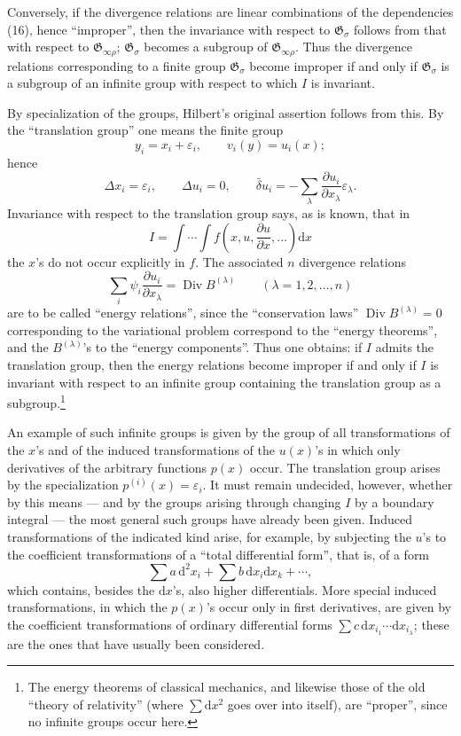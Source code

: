 \documentclass[11pt]{article}
\newcommand{\D}{\Delta}
\providecommand{\eps}{\varepsilon}
\providecommand{\dd}{\mathrm d}
\providecommand{\Div}{\operatorname{Div}}
\providecommand{\G}{\mathfrak G}
\providecommand{\bd}{\bar{\delta}}
\providecommand{\p}{\partial}
\begin{document}
Conversely, if the divergence relations are linear combinations of the dependencies (16), hence ``improper'', then the invariance with respect to \(\G_\sigma\) follows from that with respect to \(\G_{\infty\rho}\); \(\G_\sigma\) becomes a subgroup of \(\G_{\infty\rho}\). Thus the divergence relations corresponding to a finite group \(\G_\sigma\) become improper if and only if \(\G_\sigma\) is a subgroup of an infinite group with respect to which \(I\) is invariant.

By specialization of the groups, Hilbert's original assertion follows from this. By the ``translation group'' one means the finite group
\[
y_i=x_i+\eps_i,\qquad v_i(y)=u_i(x);
\]
hence
\[
\D x_i=\eps_i,\qquad \D u_i=0,\qquad
\bd u_i=-\sum_\lambda\frac{\p u_i}{\p x_\lambda}\eps_\lambda.
\]
Invariance with respect to the translation group says, as is known, that in
\[
I=\int\!\cdots\!\int f\!\left(x,u,\frac{\p u}{\p x},\ldots\right)\dd x
\]
the \(x\)'s do not occur explicitly in \(f\). The associated \(n\) divergence relations
\[
\sum_i\psi_i\frac{\p u_i}{\p x_\lambda}=\Div B^{(\lambda)}
\qquad(\lambda=1,2,\ldots,n)
\]
are to be called ``energy relations'', since the ``conservation laws'' \(\Div B^{(\lambda)}=0\) corresponding to the variational problem correspond to the ``energy theorems'', and the \(B^{(\lambda)}\)'s to the ``energy components''. Thus one obtains: if \(I\) admits the translation group, then the energy relations become improper if and only if \(I\) is invariant with respect to an infinite group containing the translation group as a subgroup.\footnote{The energy theorems of classical mechanics, and likewise those of the old ``theory of relativity'' (where \(\sum \dd x^2\) goes over into itself), are ``proper'', since no infinite groups occur here.}

An example of such infinite groups is given by the group of all transformations of the \(x\)'s and of the induced transformations of the \(u(x)\)'s in which only derivatives of the arbitrary functions \(p(x)\) occur. The translation group arises by the specialization \(p^{(i)}(x)=\eps_i\). It must remain undecided, however, whether by this means --- and by the groups arising through changing \(I\) by a boundary integral --- the most general such groups have already been given. Induced transformations of the indicated kind arise, for example, by subjecting the \(u\)'s to the coefficient transformations of a ``total differential form'', that is, of a form
\[
\sum a\,\dd^2x_i+\sum b\,\dd x_i\dd x_k+\cdots,
\]
which contains, besides the \(\dd x\)'s, also higher differentials. More special induced transformations, in which the \(p(x)\)'s occur only in first derivatives, are given by the coefficient transformations of ordinary differential forms \(\sum c\,\dd x_{i_1}\cdots \dd x_{i_\lambda}\); these are the ones that have usually been considered.
\end{document}
